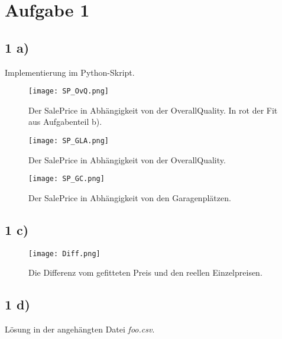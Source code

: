 \section{Aufgabe 1}

\subsection{1 a)}
Implementierung im Python-Skript.

\begin{figure}[H]
\centering
\texttt{[image: SP\_OvQ.png]}
\caption{Der SalePrice in Abhängigkeit von der OverallQuality. In rot der Fit aus Aufgabenteil b).}
\end{figure}


\begin{figure}[H]
\centering
\texttt{[image: SP\_GLA.png]}
\caption{Der SalePrice in Abhängigkeit von der OverallQuality.}
\end{figure}


\begin{figure}[H]
\centering
\texttt{[image: SP\_GC.png]}
\caption{Der SalePrice in Abhängigkeit von den Garagenplätzen.}
\end{figure}

\subsection{1 c)}

\begin{figure}[H]
\centering
\texttt{[image: Diff.png]}
\caption{Die Differenz vom gefitteten Preis und den reellen Einzelpreisen.}
\end{figure}

\subsection{1 d)}

Lösung in der angehängten Datei \textit{foo.csv}.
